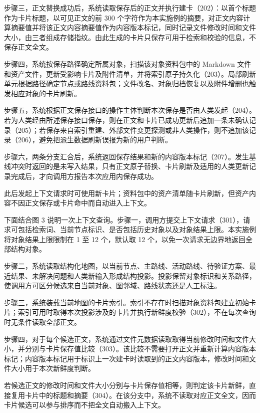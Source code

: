  步骤三，正文替换成功后，系统读取保存后的正文并执行建卡（202）：以首个标题作为卡片标题，以可见正文的前 300 个字符作为本实施例的摘要，对正文内容计算摘要值并将该正文内容摘要值作为内容版本标记，同时记录文件修改时间和文件大小，由三者组成存储指纹。由此生成的卡片只保存可用于检索和校验的信息，不保存正文全文。

 步骤四，系统按保存路径确定所属对象，扫描该对象资料包中的 Markdown 文件和资产文件，更新受影响卡片及附件清单，并将索引原子持久化（203）。局部刷新单元根据路径确定节点或路线资料包；文件改名、对象归档恢复以及附件增删也触发相应对象的卡片刷新。

 步骤五，系统根据正文保存接口的操作主体判断本次保存是否由人类发起（204）。若为人类经由所述保存接口保存，则在正文和卡片已成功更新后追加一条未确认记录（205）；若保存来自索引重建、外部文件变更探测或非人类操作，则不追加该记录（206），避免把派生数据刷新误报为新的用户判断。

 步骤六，两条分支汇合后，系统返回保存结果和新的内容版本标记（207）。发生基线冲突时返回的是未写入结果，只有正文原子替换、卡片刷新及适用的人类更新记录完成后，才向调用方报告本次应用内保存成功。

 此后发起上下文请求时可使用新卡片；资料包中的资产清单随卡片刷新，但资产内容不因正文保存或卡片命中而自动进入上下文。

 下面结合图 3 说明一次上下文查询。步骤一，调用方提交上下文请求（301），请求可包括检索词、当前节点标识、是否包括历史对象以及对象结果上限。本实施例将对象结果上限限制在 1 至 12 个，默认取 12 个，以免一次请求无边界地返回全部结构对象。

 步骤二，系统读取结构化地图，以当前节点、主路线、活动路线、待验证方案、最近结果、未解决问题和人类新输入形成结构投影。投影保留对象标识和关系路径，使调用方可区分候选来自当前对象、图邻域、路线状态还是人工标注。

 步骤三，系统装载当前地图的卡片索引。索引不存在时扫描对象资料包建立初始卡片；索引可用时取得本次投影涉及的卡片并执行新鲜度校验（302），不在每次查询时无条件读取全部正文。

 步骤四，对于每个候选正文，系统通过文件元数据读取取得当前修改时间和文件大小，并分别与卡片保存值比较（303）。该比较不需要打开正文并重新计算内容版本标记；内容版本标记用于标识上一次建卡时读取到的正文内容版本，修改时间和文件大小用于本次新鲜度判断。

 若候选正文的修改时间和文件大小分别与卡片保存值相等，则判定该卡片新鲜，直接复用卡片中的标题和摘要（304）。在该分支中，系统不读取对应正文全文，因而卡片候选可以参与排序而不把全文自动搬入上下文。

